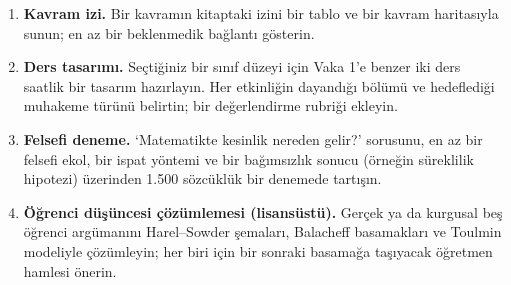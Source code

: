 
\begin{enumerate}[leftmargin=1.8em,label=\textbf{\arabic*.}]
\item \textbf{Kavram izi.} Bir kavramın kitaptaki izini bir tablo ve bir kavram haritasıyla sunun; en az bir beklenmedik bağlantı gösterin.
\item \textbf{Ders tasarımı.} Seçtiğiniz bir sınıf düzeyi için Vaka 1’e benzer iki ders saatlik bir tasarım hazırlayın. Her etkinliğin dayandığı bölümü ve hedeflediği muhakeme türünü belirtin; bir değerlendirme rubriği ekleyin.
\item \textbf{Felsefi deneme.} ‘Matematikte kesinlik nereden gelir?’ sorusunu, en az bir felsefi ekol, bir ispat yöntemi ve bir bağımsızlık sonucu (örneğin süreklilik hipotezi) üzerinden 1.500 sözcüklük bir denemede tartışın.
\item \textbf{Öğrenci düşüncesi çözümlemesi (lisansüstü).} Gerçek ya da kurgusal beş öğrenci argümanını Harel–Sowder şemaları, Balacheff basamakları ve Toulmin modeliyle çözümleyin; her biri için bir sonraki basamağa taşıyacak öğretmen hamlesi önerin.
\end{enumerate}
